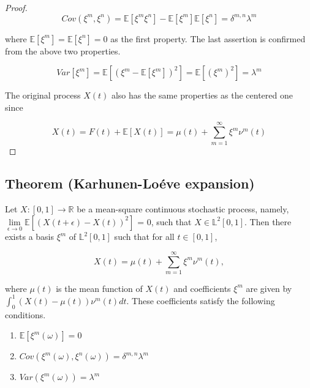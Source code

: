 \documentclass[11pt,twoside,a4paper]{article}
\begin{document}
\begin{proof}
		\begin{equation}
			Cov\left(\xi^m, \xi^n\right) = \mathbb{E}[\xi^m \xi^n] - \mathbb{E}[\xi^m]\mathbb{E}[\xi^n] = \delta^{m,n}\lambda^{m}
		\end{equation}
	
		where $\mathbb{E}[\xi^m] = \mathbb{E}[\xi^n] = 0$ as the first property.
		The last assertion is confirmed from the above two properties.
		
		\begin{equation}\label{Lemma3}
			Var[\xi^m] = \mathbb{E}\left[(\xi^m - \mathbb{E}[\xi^m])^{2}\right] = \mathbb{E}[(\xi^m)^{2}] =\lambda^m
		\end{equation}
	
		The original process $X(t)$ also has the same properties as the centered one since
		
		\begin{equation}
			X(t) = F(t) + \mathbb{E}[X(t)] = \mu(t) + \sum_{m=1}^{\infty}\xi^m\nu^m(t)
		\end{equation}
	
	\end{proof}
	
	
	\subsection{Theorem (Karhunen-Lo\'{e}ve expansion)} \label{Proof2}
	
	Let $X : [0,1]  \rightarrow \mathbb{R}$ be a mean-square continuous stochastic process, namely, $\lim\limits_{\epsilon \rightarrow 0} \mathbb{E}[(X(t+\epsilon) - X(t))^2]$ = 0, such that $X \in \mathbb{L}^{2}[0,1]$. Then there exists a basis ${\xi^m}$ of $\mathbb{L}^2[0,1]$ such that for all $t \in [0,1]$,
	
	\begin{equation}
		X(t) = \mu(t) + \sum_{m=1}^{\infty} \xi^m \nu^m(t),
	\end{equation}

	where $\mu(t)$ is the mean function of $X(t)$ and coefficients $\xi^m$ are given by $\int_{0}^{1} (X(t) - \mu(t)) \nu^m(t)dt$. These coefficients satisfy the following conditions.
	
	\begin{multicols}{2}
		\begin{enumerate}
			\item $\mathbb{E}\left[\xi^m(\omega)\right] = 0$
			\item $Cov\left(\xi^m(\omega), \xi^n(\omega)\right) = \delta^{m,n}\lambda^m$ %
			\item $Var\left(\xi^m(\omega)\right) = \lambda^m$
		\end{enumerate}
	\end{multicols}
\end{document}
